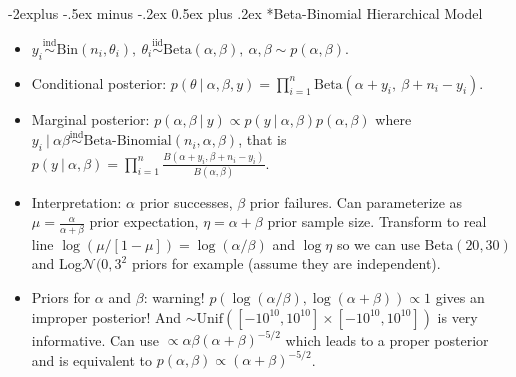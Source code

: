 \documentclass[paper=a4,fontsize=2.73mm]{scrartcl}
\makeatletter
\newcommand\given[1][]{\:#1\vert\:}
\newcommand{\ind}{\stackrel{\text{ind}}{\sim}}
\newcommand{\iid}{\stackrel{\text{iid}}{\sim}}
\newcommand{\Norm}{\mathcal{N}}
\renewcommand{\subsection}{\@startsection{subsection}{2}{0mm}%
                                {-2explus -.5ex minus -.2ex}%
                                {0.5ex plus .2ex}%
                                {\normalfont\normalsize\bfseries}}
\makeatother
\begin{document}
\begin{multicols}{3}
\subsection*{Beta-Binomial Hierarchical Model}
\begin{itemize}
	\item $y_i \ind \text{Bin}(n_i, \theta_i), ~ \theta_i \iid\text{Beta}(\alpha, \beta), ~ \alpha, \beta \sim p(\alpha, \beta)$.
	\item Conditional posterior: $p(\theta \given \alpha, \beta, y) = \prod_{i=1}^n \text{Beta}(\alpha + y_i, ~ \beta + n_i - y_i)$.
	\item Marginal posterior: $p(\alpha, \beta \given y) \propto p(y\given \alpha, \beta)p(\alpha, \beta)$ where $y_i\given \alpha \beta \ind \text{Beta-Binomial}(n_i, \alpha, \beta)$, that is 
	$p(y\given\alpha,\beta) = \prod_{i=1}^n \frac{B(\alpha + y_i, \beta + n_i-y_i)}{B(\alpha, \beta)}.$
	\item Interpretation: $\alpha$ prior successes, $\beta$ prior failures. Can parameterize as $\mu = \frac{\alpha}{\alpha + \beta}$ prior expectation, $\eta = \alpha + \beta$ prior sample size. Transform to real line $\log(\mu/[1-\mu]) = \log(\alpha/\beta)$ and $\log\eta$ so we can use Beta$(20,30)$ and Log$\Norm(0, 3^2$ priors for example (assume they are independent).
	\item Priors for $\alpha$ and $\beta$: warning! $p(\log(\alpha/\beta), \log(\alpha + \beta)) \propto 1$ gives an improper posterior! And $\sim \text{Unif}( [-10^{10}, 10^{10}]\times [-10^{10}, 10^{10}])$ is very informative. Can use $\propto \alpha\beta(\alpha + \beta)^{-5/2}$ which leads to a proper posterior and is equivalent to $p(\alpha,\beta) \propto (\alpha + \beta)^{-5/2}$.
\end{itemize}


\end{multicols}
\end{document}
